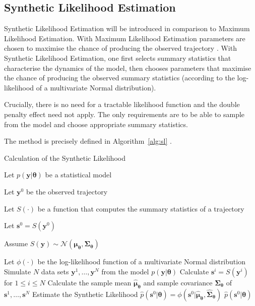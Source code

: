 \subsection{Synthetic Likelihood Estimation}
\label{subsec:sl-method}

Synthetic Likelihood Estimation will be introduced in comparison to Maximum Likelihood Estimation. With Maximum Likelihood Estimation  parameters are chosen to maximise the chance of producing the observed trajectory \citep[p.~226]{rossi_2018}. With Synthetic Likelihood Estimation, one first selects summary statistics that characterise the dynamics of the model, then chooses parameters that maximise the chance of producing the observed summary statistics (according to the log-likelihood of a multivariate Normal distribution).

Crucially, there is no need for a tractable likelihood function and the double penalty effect need not apply. The only requirements are to be able to sample from the model and choose appropriate summary statistics.

The method is precisely defined in Algorithm~\ref{alg:sl} \citep{fasiolo_pya_wood_2016}.

\begin{singlespace}
\begin{algorithm}[H]
    \caption{Calculation of the Synthetic Likelihood}
    \label{alg:sl}
    \begin{algorithmic}
        \State Let $p(\pmb{y} | \pmb{\theta})$ be a statistical model
    
        \State Let $\pmb{y}^0$ be the observed trajectory
    
        \State Let $S(\cdot)$ be a function that computes the summary statistics of a trajectory
    
        \State Let $\pmb{s}^0 = S(\pmb{y}^0)$
    
        \State Assume $S(\pmb{y}) \sim \mathcal{N}(\pmb{\mu_\theta}, \pmb{\Sigma_\theta})$
        
        \State Let $\phi(\cdot)$ be the log-likelihood function of a multivariate Normal distribution
        \newline
            \State Simulate $N$ data sets $\pmb{y}^1, \ldots, \pmb{y}^N$ from the model $p(\pmb{y} | \pmb{\theta})$
            \State Calculate $\pmb{s}^i = S(\pmb{y}^i)$ for $1 \leq i \leq N$
            \State Calculate the sample mean $\hat{\pmb{\mu}}_{\pmb{\theta}}$ and sample covariance $\hat{\pmb{\Sigma}}_{\pmb{\theta}}$ of $\pmb{s}^1, \ldots, \pmb{s}^N$
            \State Estimate the Synthetic Likelihood $\hat{p}(\pmb{s}^0 | \pmb{\theta}) = \phi(\pmb{s}^0 | \hat{\pmb{\mu}}_{\pmb{\theta}}, \hat{\pmb{\Sigma}}_{\pmb{\theta}})$
            \State \Return $\hat{p}(\pmb{s}^0 | \pmb{\theta})$
        \EndProcedure
    \end{algorithmic}
\end{algorithm}
\end{singlespace}

